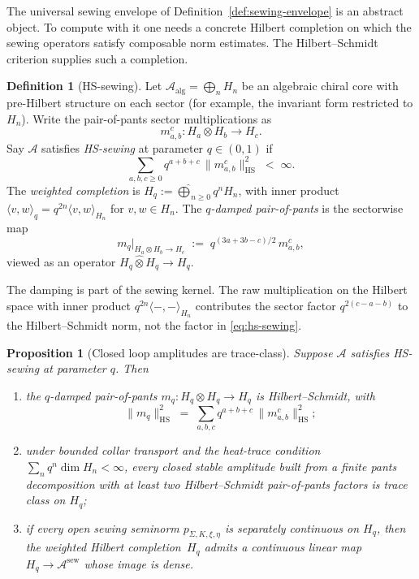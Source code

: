 \documentclass[11pt,reqno]{amsart}
\newtheorem{proposition}[theorem]{Proposition}
\theoremstyle{definition}
\newtheorem{definition}[theorem]{Definition}
\theoremstyle{remark}
\newcommand{\cA}{\mathcal{A}}
\newcommand{\HS}{\mathrm{HS}}
\numberwithin{equation}{section}
\begin{document}
The universal sewing envelope of
Definition~\ref{def:sewing-envelope} is an abstract object. To
compute with it one needs a concrete Hilbert completion on which
the sewing operators satisfy composable norm estimates. The
Hilbert--Schmidt criterion supplies such a completion.

\begin{definition}[HS-sewing]\label{def:hs-sewing}
Let $\cA_{\mathrm{alg}} = \bigoplus_n H_n$ be an algebraic chiral
core with pre-Hilbert structure on each sector (for example, the
invariant form restricted to $H_n$). Write the pair-of-pants
sector multiplications as
\[
m_{a,b}^c \colon H_a \otimes H_b \longrightarrow H_c.
\]
Say $\cA$ satisfies \emph{HS-sewing} at parameter $q \in (0,1)$ if
\begin{equation}\label{eq:hs-sewing}
\sum_{a,b,c \geq 0} q^{a+b+c}\,
\|m_{a,b}^c\|_{\HS}^2
\;<\; \infty.
\end{equation}
	The \emph{weighted completion} is
	$H_q := \widehat{\bigoplus}_{n \geq 0} q^n H_n$, with inner
	product $\langle v, w \rangle_q = q^{2n}\langle v, w\rangle_{H_n}$
	for $v, w \in H_n$.
	The \emph{$q$-damped pair-of-pants} is the sectorwise map
	\[
	m_q\big|_{H_a\otimes H_b\to H_c}
	\;:=\;
	q^{(3a+3b-c)/2}\,m_{a,b}^c ,
	\]
	viewed as an operator $H_q\widehat\otimes H_q\to H_q$.
	\end{definition}

	The damping is part of the sewing kernel. The raw multiplication on
	the Hilbert space with inner product
	$q^{2n}\langle-,-\rangle_{H_n}$ contributes the sector factor
	$q^{2(c-a-b)}$ to the Hilbert--Schmidt norm, not the factor in
	\eqref{eq:hs-sewing}.

\begin{proposition}[Closed loop amplitudes are trace-class]
\label{prop:closed-trace-class}
Suppose $\cA$ satisfies HS-sewing at parameter $q$. Then
\begin{enumerate}[label=\textup{(\roman*)}]
\item the $q$-damped pair-of-pants
$m_q \colon H_q \otimes H_q \to H_q$ is Hilbert--Schmidt, with
\[
\|m_q\|_{\HS}^2
\;=\;
\sum_{a,b,c} q^{a+b+c}\, \|m_{a,b}^c\|_{\HS}^2;
\]
\item under bounded collar transport and the heat-trace condition
$\sum_n q^n\dim H_n<\infty$, every closed stable amplitude built
from a finite pants decomposition with at least two
Hilbert--Schmidt pair-of-pants factors is trace class on $H_q$;
\item if every open sewing seminorm
$p_{\Sigma,K,\xi,\eta}$ is separately continuous on $H_q$, then
the weighted Hilbert completion~$H_q$ admits a continuous linear
map $H_q \to \cA^{\mathrm{sew}}$ whose image is dense.
\end{enumerate}
\end{proposition}
\end{document}
